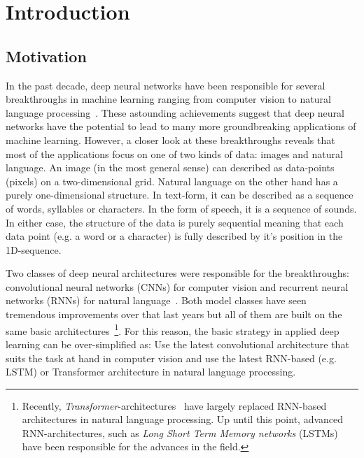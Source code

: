 \chapter{Introduction}
\label{chapter:Introduction}


\section{Motivation}
\label{sec:motivation}

In the past decade, deep neural networks have been responsible for several breakthroughs in machine learning ranging from computer vision to natural language processing~\cite{Goodfellow-et-al-2016}. These astounding achievements suggest that deep neural networks have the potential to lead to many more groundbreaking applications of machine learning. However, a closer look at these breakthroughs reveals that most of the applications focus on one of two kinds of data: images and natural language. An image (in the most general sense) can described as data-points (pixels) on a two-dimensional grid. Natural language on the other hand has a purely one-dimensional structure. In text-form, it can be described as a sequence of words, syllables or characters. In the form of speech, it is a sequence of sounds. In either case, the structure of the data is purely sequential meaning that each data point (e.g. a word or a character) is fully described by it's position in the 1D-sequence.

Two classes of deep neural architectures were responsible for the breakthroughs: convolutional neural networks (CNNs) for computer vision and recurrent neural networks (RNNs) for natural language~\cite{Goodfellow-et-al-2016}. Both model classes have seen tremendous improvements over that last years but all of them are built on the same basic architectures~\footnote{Recently, \textit{Transformer}-architectures~\cite{Vaswani2017} have largely replaced RNN-based architectures in natural language processing. Up until this point, advanced RNN-architectures, such as \textit{Long Short Term Memory networks} (LSTMs)~\cite{Hochreiter1997} have been responsible for the advances in the field.}. For this reason, the basic strategy in applied deep learning can be over-simplified as: Use the latest convolutional architecture that suits the task at hand in computer vision and use the latest RNN-based (e.g. LSTM) or Transformer architecture in natural language processing.

